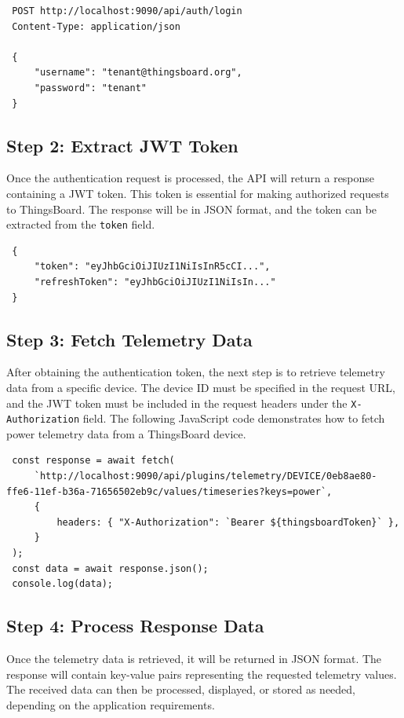\documentclass[a4paper,12pt]{report}
\begin{document}
 \begin{lstlisting}
 POST http://localhost:9090/api/auth/login
 Content-Type: application/json
 
 {
     "username": "tenant@thingsboard.org",
     "password": "tenant"
 }
 \end{lstlisting}
 
 \subsection{Step 2: Extract JWT Token}
 Once the authentication request is processed, the API will return a response containing a JWT token. This token is essential for making authorized requests to ThingsBoard. The response will be in JSON format, and the token can be extracted from the \texttt{token} field.
 
 \begin{lstlisting}
 {
     "token": "eyJhbGciOiJIUzI1NiIsInR5cCI...",
     "refreshToken": "eyJhbGciOiJIUzI1NiIsIn..."
 }
 \end{lstlisting}
 
 \subsection{Step 3: Fetch Telemetry Data}
 After obtaining the authentication token, the next step is to retrieve telemetry data from a specific device. The device ID must be specified in the request URL, and the JWT token must be included in the request headers under the \texttt{X-Authorization} field. The following JavaScript code demonstrates how to fetch power telemetry data from a ThingsBoard device.
 
 \begin{lstlisting}
 const response = await fetch( 
     `http://localhost:9090/api/plugins/telemetry/DEVICE/0eb8ae80-ffe6-11ef-b36a-71656502eb9c/values/timeseries?keys=power`,
     {
         headers: { "X-Authorization": `Bearer ${thingsboardToken}` },
     }
 );
 const data = await response.json();
 console.log(data);
 \end{lstlisting}
 
 \subsection{Step 4: Process Response Data}
 Once the telemetry data is retrieved, it will be returned in JSON format. The response will contain key-value pairs representing the requested telemetry values. The received data can then be processed, displayed, or stored as needed, depending on the application requirements.
\end{document}
